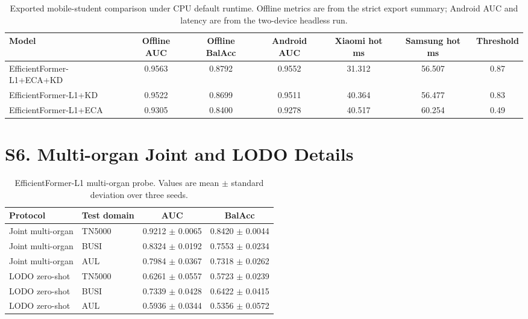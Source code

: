 \documentclass[preprint,12pt]{elsarticle}
\newcommand{\suppsection}[1]{\Needspace{0.35\textheight}\section*{#1}}
\begin{document}
\begin{table}[H]
    \centering
    \small
    \caption{Exported mobile-student comparison under CPU default runtime. Offline metrics are from the strict export summary; Android AUC and latency are from the two-device headless run.}
    \label{tab:s_android_students}
    \begin{adjustbox}{max width=\columnwidth}
    \begin{tabular}{lcccccc}
        \toprule
        Model & Offline AUC & Offline BalAcc & Android AUC & Xiaomi hot ms & Samsung hot ms & Threshold \\
        \midrule
        EfficientFormer-L1+ECA+KD & 0.9563 & 0.8792 & 0.9552 & 31.312 & 56.507 & 0.87 \\
        EfficientFormer-L1+KD & 0.9522 & 0.8699 & 0.9511 & 40.364 & 56.477 & 0.83 \\
        EfficientFormer-L1+ECA & 0.9305 & 0.8400 & 0.9278 & 40.517 & 60.254 & 0.49 \\
        \bottomrule
    \end{tabular}
    \end{adjustbox}
\end{table}

\suppsection{S6. Multi-organ Joint and LODO Details}

\begin{table}[H]
    \centering
    \small
    \caption{EfficientFormer-L1 multi-organ probe. Values are mean $\pm$ standard deviation over three seeds.}
    \label{tab:s_cross_organ_detail}
    \begin{adjustbox}{max width=\columnwidth}
    \begin{tabular}{llcc}
        \toprule
        Protocol & Test domain & AUC & BalAcc \\
        \midrule
        Joint multi-organ & TN5000 & 0.9212 $\pm$ 0.0065 & 0.8420 $\pm$ 0.0044 \\
        Joint multi-organ & BUSI & 0.8324 $\pm$ 0.0192 & 0.7553 $\pm$ 0.0234 \\
        Joint multi-organ & AUL & 0.7984 $\pm$ 0.0367 & 0.7318 $\pm$ 0.0262 \\
        LODO zero-shot & TN5000 & 0.6261 $\pm$ 0.0557 & 0.5723 $\pm$ 0.0239 \\
        LODO zero-shot & BUSI & 0.7339 $\pm$ 0.0428 & 0.6422 $\pm$ 0.0415 \\
        LODO zero-shot & AUL & 0.5936 $\pm$ 0.0344 & 0.5356 $\pm$ 0.0572 \\
        \bottomrule
    \end{tabular}
    \end{adjustbox}
\end{table}
\end{document}
